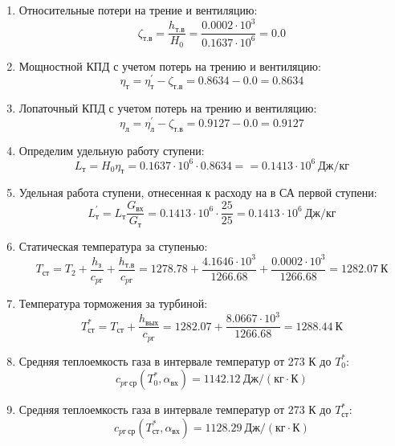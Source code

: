 \documentclass[a4paper,10pt]{article}
\begin{document}
\begin{enumerate}
        \item Относительные потери на трение и вентиляцию:
        \[
            \zeta_{т.в} = \frac{ h_{т.в} }{ H_0 } =
                \frac{ 0.0002 \cdot 10^3 }{ 0.1637 \cdot 10^6 } =
            0.0
        \]

        \item Мощностной КПД с учетом потерь на трению и вентиляцию:
        \[
            \eta_т = \eta_т^\prime - \zeta_{т.в} =
                0.8634 - 0.0 =
            0.8634
        \]

        \item Лопаточный КПД с учетом потерь на трению и вентиляцию:
        \[
            \eta_л = \eta_л^\prime - \zeta_{т.в} =
                0.9127 - 0.0 =
            0.9127
        \]

        \item Определим удельную работу ступени:
        \[
            L_т = H_0 \eta_т = 0.1637 \cdot 10^6 \cdot 0.8634 =
            = 0.1413 \cdot 10^6 \ Дж/кг
        \]

        \item Удельная работа ступени, отнесенная к расходу на в СА первой ступени:
        \[
            L_т^\prime = L_т \frac{ G_{вх} }{ G_т }  =
                0.1413 \cdot 10^6 \cdot
                \frac{ 25 }{ 25 } =
            0.1413 \cdot 10^6 \ Дж/кг
        \]

        \item Статическая температура за ступенью:
        \[
            T_{ст} = T_2 + \frac{ h_з }{ c_{pг} } + \frac{ h_{т.в} }{ c_{pг} } =
                1278.78 +
                \frac{4.1646 \cdot 10^3 }{ 1266.68 } +
                \frac{ 0.0002 \cdot 10^3 }{ 1266.68 } =
            1282.07 \ К
        \]

        \item Температура торможения за турбиной:
        \[
            T_{ст}^* = T_{ст} + \frac{ h_{вых} }{ c_{pг} } =
                1282.07 +
                \frac{ 8.0667 \cdot 10^3 }{ 1266.68 } =
            1288.44 \ К
        \]

        \item Средняя теплоемкость газа в интервале температур от 273 К до $T_0^*$:
        \[
            c_{pг\ ср} (T_0^*, \alpha_{вх}) =
            1142.12 \ Дж/(кг \cdot К)
        \]

        \item Средняя теплоемкость газа в интервале температур от 273 К до $T_{ст}^*$:
        \[
            c_{pг\ ср} (T_{ст}^*, \alpha_{вх}) =
            1128.29 \ Дж/(кг \cdot К)
        \]


\end{enumerate}
\end{document}
